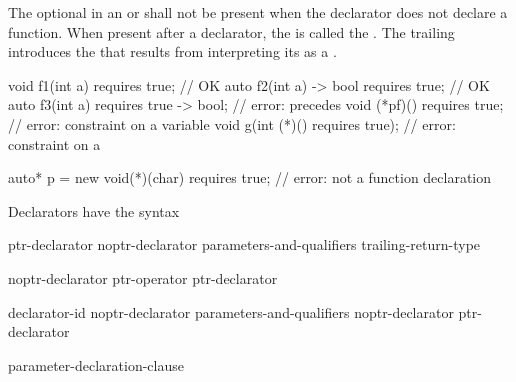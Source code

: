 \pnum
The optional  in an
 or 
shall not be present when the declarator does not declare a
function.
%
%
When present after a declarator, the 
is called the .
The trailing  introduces the
 that results from interpreting
its  as a
.
%
\begin{example}
\begin{codeblock}
void f1(int a) requires true;               // OK
auto f2(int a) -> bool requires true;       // OK
auto f3(int a) requires true -> bool;       // error:  precedes 
void (*pf)() requires true;                 // error: constraint on a variable
void g(int (*)() requires true);            // error: constraint on a 

auto* p = new void(*)(char) requires true;  // error: not a function declaration
\end{codeblock}
\end{example}

\pnum
Declarators have the syntax

\begin{bnf}
\br
    ptr-declarator\br
    noptr-declarator parameters-and-qualifiers trailing-return-type
\end{bnf}

\begin{bnf}
\br
    noptr-declarator\br
    ptr-operator ptr-declarator
\end{bnf}

\begin{bnf}
\br
    declarator-id \br
    noptr-declarator parameters-and-qualifiers\br
    noptr-declarator \terminal{[}  \terminal{]} \br
    \terminal{(} ptr-declarator \terminal{)}
\end{bnf}

\begin{bnf}
\br
    \terminal{(} parameter-declaration-clause \terminal{)} \br
    \bnfindent{}  
\end{bnf}

